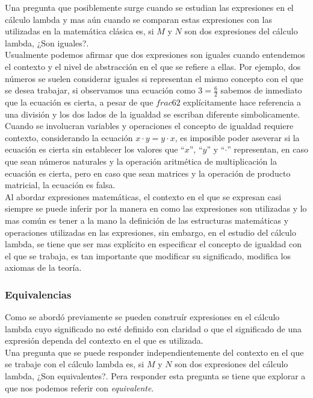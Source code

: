 Una pregunta que posiblemente surge cuando se estudian las expresiones en el
cálculo lambda y mas aún cuando se comparan estas expresiones con las utilizadas en
la matemática clásica es, si \(M\) y \(N\) son dos expresiones del cálculo
lambda, ¿Son iguales?.\\

Usualmente podemos afirmar que dos expresiones son iguales cuando entendemos el
contexto y el nivel de abstracción en el que se refiere a ellas. Por ejemplo,
dos números se suelen considerar iguales si representan el mismo concepto con el
que se desea trabajar, si observamos una ecuación como \(3=\frac{6}{2}\) sabemos
de inmediato que la ecuación es cierta, a pesar de que \(frac{6}{2}\)
explícitamente hace referencia a una división y los dos lados de la igualdad se
escriban diferente simbolicamente. Cuando se involucran variables y operaciones
el concepto de igualdad requiere contexto, considerando la ecuación \(x\cdot
y=y\cdot x\), es imposible poder aseverar si la ecuación es cierta sin
establecer los valores que ``\(x\)'', ``\(y\)'' y ``\(\cdot\)'' representan, en
caso que sean números naturales y la operación aritmética de multiplicación la
ecuación es cierta, pero en caso que sean matrices y la operación de producto
matricial, la ecuación es falsa.\\

Al abordar expresiones matemáticas, el contexto en el que se expresan casi siempre
se puede inferir por la manera en como las expresiones son utilizadas y lo mas
común es tener a la mano la definición de las estructuras matemáticas y
operaciones utilizadas en las expresiones, sin embargo, en el estudio del cálculo
lambda, se tiene que ser mas explícito en especificar el concepto de igualdad
con el que se trabaja, es tan importante que modificar su significado, modifica los
axiomas de la teoría.\\



\subsubsection{Equivalencias}

Como se abordó previamente se pueden construír expresiones en el cálculo lambda
cuyo significado no esté definido con claridad o que el significado de una
expresión dependa del contexto en el que es utilizada.\\

Una pregunta que se puede responder independientemente del contexto en el que se
trabaje con el cálculo lambda es, si \(M\) y \(N\) son dos expresiones del
cálculo lambda, ¿Son equivalentes?. Pera responder esta pregunta se tiene que
explorar a que nos podemos referir con \emph{equivalente}.\\

